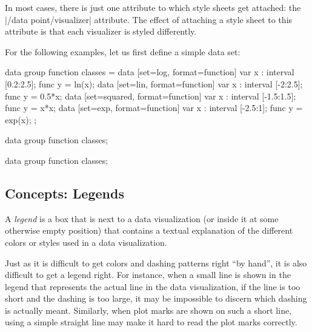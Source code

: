 In most cases, there is just one attribute to which style sheets get attached:
the |/data point/visualizer| attribute. The effect of attaching a style sheet
to this attribute is that each visualizer is styled differently.

For the following examples, let us first define a simple data set:
%
\begin{codeexample}[]
\tikz \datavisualization data group {function classes} = {
  data [set=log, format=function] {
    var x : interval [0.2:2.5];
    func y = ln(\value x);
  }
  data [set=lin, format=function] {
    var x : interval [-2:2.5];
    func y = 0.5*\value x;
  }
  data [set=squared, format=function] {
    var x : interval [-1.5:1.5];
    func y = \value x*\value x;
  }
  data [set=exp, format=function] {
    var x : interval [-2.5:1];
    func y = exp(\value x);
  }
};
\end{codeexample}

\begin{codeexample}[width=6cm]
\tikz \datavisualization [
  school book axes, all axes={unit length=7.5mm},
  visualize as smooth line/.list={log, lin, squared, exp},
  style sheet=strong colors]
data group {function classes};
\end{codeexample}

\begin{codeexample}[width=6cm]
\tikz \datavisualization [
  school book axes, all axes={unit length=7.5mm},
  visualize as smooth line/.list={log, lin, squared, exp},
  style sheet=vary dashing]
data group {function classes};
\end{codeexample}


\subsection{Concepts: Legends}
\label{section-dv-labels-in}

A \emph{legend} is a box that is next to a data visualization (or inside it at
some otherwise empty position) that contains a textual explanation of the
different colors or styles used in a data visualization.

Just as it is difficult to get colors and dashing patterns right ``by hand'',
it is also difficult to get a legend right. For instance, when a small line is
shown in the legend that represents the actual line in the data visualization,
if the line is too short and the dashing is too large, it may be impossible to
discern which dashing is actually meant. Similarly, when plot marks are shown
on such a short line, using a simple straight line may make it hard to read the
plot marks correctly.

